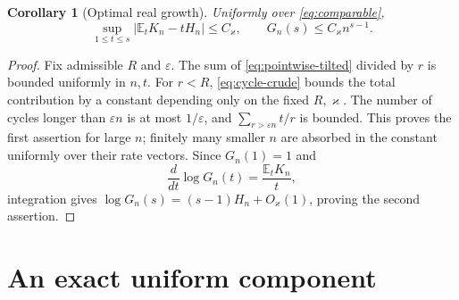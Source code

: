 \documentclass[11pt]{article}
\numberwithin{equation}{section}
\newtheorem{corollary}[theorem]{Corollary}
\theoremstyle{definition}
\theoremstyle{remark}
\newcommand{\E}{\mathbb E}
\newcommand{\eps}{\varepsilon}
\begin{document}
\begin{corollary}[Optimal real growth]\label{cor:real-growth}
Uniformly over \eqref{eq:comparable},
\begin{equation}\label{eq:tilted-mean-total}
 \sup_{1\le t\le s}|\E_tK_n-tH_n|\le C_\varkappa,
 \qquad
 G_n(s)\le C_\varkappa n^{s-1}.
\end{equation}
\end{corollary}
\begin{proof}
Fix admissible $R$ and $\eps$. The sum of \eqref{eq:pointwise-tilted} divided by $r$ is bounded uniformly in $n,t$. For $r<R$, \eqref{eq:cycle-crude} bounds the total contribution by a constant depending only on the fixed $R,\varkappa$. The number of cycles longer than $\eps n$ is at most $1/\eps$, and $\sum_{r>\eps n}t/r$ is bounded. This proves the first assertion for large $n$; finitely many smaller $n$ are absorbed in the constant uniformly over their rate vectors. Since $G_n(1)=1$ and
\[
 \frac{d}{dt}\log G_n(t)=\frac{\E_tK_n}{t},
\]
integration gives $\log G_n(s)=(s-1)H_n+O_\varkappa(1)$, proving the second assertion.
\end{proof}

\section{An exact uniform component}\label{sec:uniform-core}
\end{document}
